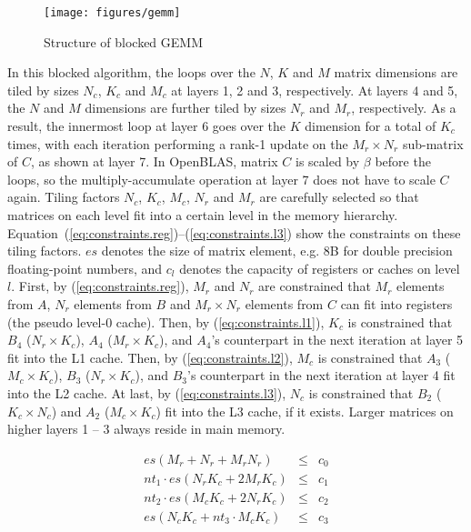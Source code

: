 \begin{figure}[t]
  \centering
  \texttt{[image: figures/gemm]}
  \caption{Structure of blocked GEMM}
  \label{fig:gemm}
\end{figure}

In this blocked algorithm, the loops over the $N$, $K$ and $M$
matrix dimensions are tiled by sizes $N_c$, $K_c$ and $M_c$ at 
layers 1, 2 and 3, respectively.
At layers 4 and 5, the $N$ and $M$ dimensions are further tiled by sizes
$N_r$ and $M_r$, respectively.
As a result, the innermost loop at layer 6 goes over the $K$
dimension for a total of $K_c$ times,
with each iteration performing a rank-1 update on
the $M_r \times N_r$ sub-matrix of $C$, as shown at layer 7.
In OpenBLAS, matrix $C$ is scaled by $\beta$ before the loops,
so the multiply-accumulate operation at layer 7 does not have to scale $C$ again.
Tiling factors $N_c$, $K_c$, $M_c$, $N_r$ and $M_r$ are carefully selected so that
matrices on each level fit into a certain level in the memory hierarchy.
Equation~(\ref{eq:constraints.reg})--(\ref{eq:constraints.l3}) show
the constraints on these tiling factors.
$es$ denotes the size of matrix element, e.g. 8B for double precision floating-point numbers,
and $c_l$ denotes the capacity of registers or caches on level $l$.
First, by (\ref{eq:constraints.reg}), $M_r$ and $N_r$ are constrained that $M_r$ elements from $A$,
$N_r$ elements from $B$ and $M_r \times N_r$ elements from $C$ can fit into registers
(the pseudo level-0 cache).
Then, by (\ref{eq:constraints.l1}), $K_c$ is constrained that $B_4$ ($N_r \times K_c$),
$A_4$ ($M_r \times K_c$), and $A_4$'s counterpart in the next iteration
at layer 5 fit into the L1 cache.
Then, by (\ref{eq:constraints.l2}), $M_c$ is constrained that $A_3$ ($M_c \times K_c$),
$B_3$ ($N_r \times K_c$), and $B_3$'s counterpart in the next iteration
at layer 4 fit into the L2 cache.
At last, by (\ref{eq:constraints.l3}), $N_c$ is constrained that 
$B_2$ ($K_c \times N_c$) and $A_2$ ($M_c \times K_c$) fit into the L3 cache, if it exists.
Larger matrices on higher layers 1 -- 3 always reside in main memory.

\begin{eqnarray}
  es (M_r + N_r + M_r N_r) & \le & c_{0} \label{eq:constraints.reg}\\
  nt_{1} \cdot es (N_r K_c + 2 M_r K_c) & \le & c_{1} \label{eq:constraints.l1}\\
  nt_{2} \cdot es (M_c K_c + 2 N_r K_c) & \le & c_{2} \label{eq:constraints.l2}\\
  es (N_c K_c + nt_{3} \cdot M_c K_c)   & \le & c_{3} \label{eq:constraints.l3}
\end{eqnarray}

